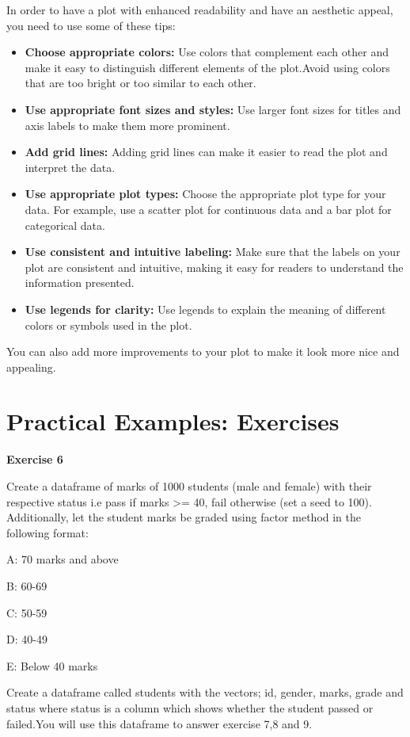 \documentclass[
]{book}
\providecommand{\tightlist}{%
  \setlength{\itemsep}{0pt}\setlength{\parskip}{0pt}}
\begin{document}
In order to have a plot with enhanced readability and have an aesthetic appeal, you need to use some of these tips:

\begin{itemize}
\tightlist
\item
  \textbf{Choose appropriate colors:} Use colors that complement each other and make it easy to distinguish different elements of the plot.Avoid using colors that are too bright or too similar to each other.
\item
  \textbf{Use appropriate font sizes and styles:} Use larger font sizes for titles and axis labels to make them more prominent.
\item
  \textbf{Add grid lines:} Adding grid lines can make it easier to read the plot and interpret the data.
\item
  \textbf{Use appropriate plot types:} Choose the appropriate plot type for your data. For example, use a scatter plot for continuous data and a bar plot for categorical data.
\item
  \textbf{Use consistent and intuitive labeling:} Make sure that the labels on your plot are consistent and intuitive, making it easy for readers to understand the information presented.
\item
  \textbf{Use legends for clarity:} Use legends to explain the meaning of different colors or symbols used in the plot.
\end{itemize}

You can also add more improvements to your plot to make it look more nice and appealing.

\section{Practical Examples: Exercises}\label{practical-examples-exercises-1}

\textbf{Exercise 6}

Create a dataframe of marks of 1000 students (male and female) with their respective status i.e pass if marks \textgreater= 40, fail otherwise (set a seed to 100). Additionally, let the student marks be graded using factor method in the following format:

A: 70 marks and above

B: 60-69

C: 50-59

D: 40-49

E: Below 40 marks

Create a dataframe called students with the vectors; id, gender, marks, grade and status where status is a column which shows whether the student passed or failed.You will use this dataframe to answer exercise 7,8 and 9.
\end{document}
